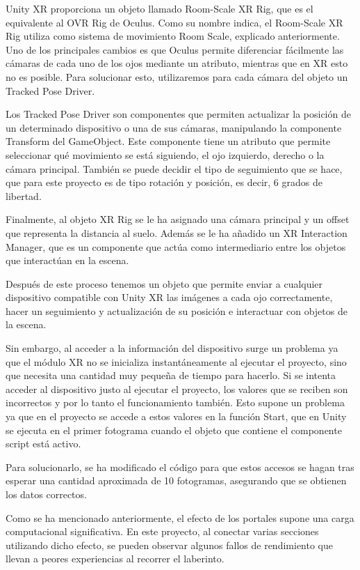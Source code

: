 \documentclass[../main.tex]{subfiles}
\begin{document}
Unity XR proporciona un objeto llamado Room-Scale XR Rig, que es el equivalente al OVR Rig de Oculus. Como su nombre indica, el Room-Scale XR Rig utiliza como sistema de movimiento Room Scale, explicado anteriormente. Uno de los principales cambios es que Oculus permite diferenciar fácilmente las cámaras de cada uno de los ojos mediante un atributo, mientras que en XR esto no es posible. Para solucionar esto, utilizaremos para cada cámara del objeto un Tracked Pose Driver.

Los Tracked Pose Driver son componentes que permiten actualizar la posición de un determinado dispositivo o una de sus cámaras, manipulando la componente Transform del GameObject. Este componente tiene un atributo que permite seleccionar qué movimiento se está siguiendo, el ojo izquierdo, derecho o la cámara principal. También se puede decidir el tipo de seguimiento que se hace, que para este proyecto es de tipo rotación y posición, es decir, 6 grados de libertad.

Finalmente, al objeto XR Rig se le ha asignado una cámara principal y un offset que representa la distancia al suelo. Además se le ha añadido un XR Interaction Manager, que es un componente que actúa como intermediario entre los objetos que interactúan en la escena. 

Después de este proceso tenemos un objeto que permite enviar a cualquier dispositivo compatible con Unity XR las imágenes a cada ojo correctamente, hacer un seguimiento y actualización de su posición e interactuar con objetos de la escena.

Sin embargo, al acceder a la información del dispositivo surge un problema ya que el módulo XR no se inicializa instantáneamente al ejecutar el proyecto, sino que necesita una cantidad muy pequeña de tiempo para hacerlo. Si se intenta acceder al dispositivo justo al ejecutar el proyecto, los valores que se reciben son incorrectos y por lo tanto el funcionamiento también. Esto supone un problema ya que en el proyecto se accede a estos valores en la función Start, que en Unity se ejecuta en el primer fotograma cuando el objeto que contiene el componente script está activo.

Para solucionarlo, se ha modificado el código para que estos accesos se hagan tras esperar una cantidad aproximada de 10 fotogramas, asegurando que se obtienen los datos correctos.

Como se ha mencionado anteriormente, el efecto de los portales supone una carga computacional significativa. En este proyecto, al conectar varias secciones utilizando dicho efecto, se pueden observar algunos fallos de rendimiento que llevan a peores experiencias al recorrer el laberinto.
\end{document}
